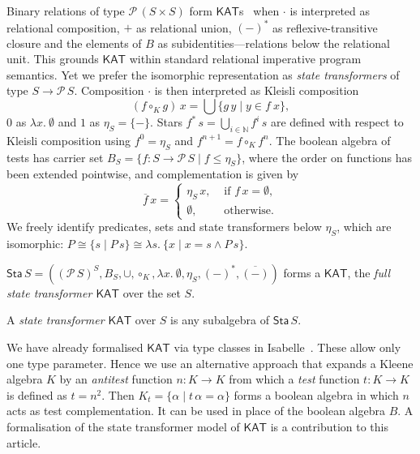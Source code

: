 \documentclass[envcountsame,envcountsect]{llncs}
\newcommand{\KAT}{\mathsf{KAT}}
\newcommand{\Pow}{\mathcal{P}}
\newcommand{\sta}{\mathsf{Sta}}
\begin{document}
Binary relations of type $\Pow\, (S\times S)$ form
$\KAT$s~\cite{Kozen97} when $\cdot$ is interpreted as relational
composition, $+$ as relational union, $(-)^\ast$ as
reflexive-transitive closure and the elements of $B$ as
subidentities---relations below the relational unit. This grounds
$\KAT$ within standard relational imperative program semantics. Yet we
prefer the isomorphic representation as \emph{state transformers} of
type $S\to \Pow\, S$.  Composition $\cdot$ is then interpreted as
Kleisli composition
\begin{equation*} 
(f\circ_K g)\, x = \bigcup\{g\, y\mid y \in f\ x \}, 
\end{equation*} 
$0$ as $\lambda x.\ \emptyset$ and $1$ as $\eta_S = \{-\}$.  Stars
$f^{\ast}\, s  = \bigcup_{i\in\mathbb{N}} f^i\, s$ are defined with
  respect to Kleisli composition using $f^{0} = \eta_S$ and
  $f^{n+1} = f \circ_K f^{n}$. The boolean algebra of tests has
  carrier set $B_S=\{f:S\to \Pow\, S \mid f\le \eta_S\}$, where the
  order on functions has been extended pointwise,  and complementation
  is given by
  \begin{equation*} 
    \overline{f}\, x =
  \begin{cases}
    \eta_S\, x, & \text{ if } f\, x = \emptyset,\\
\emptyset, & \text{ otherwise}.
  \end{cases}
\end{equation*}
We freely identify predicates, sets and state 
transformers below $\eta_S$, which are isomorphic:
$P\cong \{s\mid P\, s\}\cong \lambda s.\ \{x\mid x=s \land P\, s\}$.

\begin{proposition}\label{P:kleisli-ka}
$\sta\, S = ((\Pow\, S)^S,B_S,\cup,\circ_K,\lambda x.\
  \emptyset, \eta_S,(-)^{\ast},\overline{(-)})$
  forms a $\KAT$, the \emph{full state transformer $\KAT$} over the
  set $S$.
\end{proposition}
A \emph{state transformer $\KAT$} over $S$ is any subalgebra of
$\sta\, S$. 

We have already formalised $\KAT$ via type classes in
Isabelle~\cite{afp:kat}.  These allow only one type parameter. Hence
we use an alternative approach that expands a Kleene algebra $K$ by an
\emph{antitest} function $n:K\to K$ from which a \emph{test} function
$t:K\to K$ is defined as $t=n^2$. Then
$K_t = \{\alpha \mid t\, \alpha = \alpha\}$ forms a boolean algebra in
which $n$ acts as test complementation. It can be used in place of the
boolean algebra $B$.  A formalisation of the state transformer model
of $\KAT$ is a contribution to this article.
\end{document}
